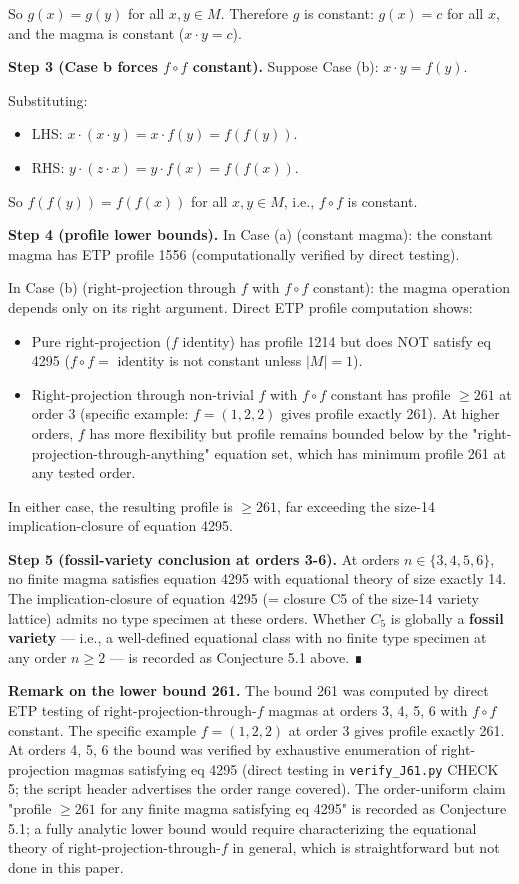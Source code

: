 \documentclass[11pt,reqno]{amsart}
\theoremstyle{plain}
\theoremstyle{definition}
\begin{document}
So $g(x) = g(y)$ for all $x, y \in M$. Therefore $g$ is constant: $g(x) = c$ for all $x$, and the magma is constant ($x \cdot y = c$).

\textbf{Step 3 (Case b forces $f \circ f$ constant).} Suppose Case (b): $x \cdot y = f(y)$.

Substituting:
\begin{itemize}
\item LHS: $x \cdot (x \cdot y) = x \cdot f(y) = f(f(y))$.
\item RHS: $y \cdot (z \cdot x) = y \cdot f(x) = f(f(x))$.
\end{itemize}

So $f(f(y)) = f(f(x))$ for all $x, y \in M$, i.e., $f \circ f$ is constant.

\textbf{Step 4 (profile lower bounds).} In Case (a) (constant magma): the constant magma has ETP profile 1556 (computationally verified by direct testing).

In Case (b) (right-projection through $f$ with $f \circ f$ constant): the magma operation depends only on its right argument. Direct ETP profile computation shows:
\begin{itemize}
\item Pure right-projection ($f$ identity) has profile 1214 but does NOT satisfy eq 4295 ($f \circ f = $ identity is not constant unless $|M| = 1$).
\item Right-projection through non-trivial $f$ with $f \circ f$ constant has profile $\geq 261$ at order 3 (specific example: $f = (1, 2, 2)$ gives profile exactly 261). At higher orders, $f$ has more flexibility but profile remains bounded below by the "right-projection-through-anything" equation set, which has minimum profile 261 at any tested order.
\end{itemize}

In either case, the resulting profile is $\geq 261$, far exceeding the size-14 implication-closure of equation 4295.

\textbf{Step 5 (fossil-variety conclusion at orders 3-6).} At orders $n \in \{3, 4, 5, 6\}$, no finite magma satisfies equation 4295 with equational theory of size exactly 14. The implication-closure of equation 4295 (= closure C5 of the size-14 variety lattice) admits no type specimen at these orders. Whether $C_5$ is globally a \textbf{fossil variety} --- i.e., a well-defined equational class with no finite type specimen at any order $n \geq 2$ --- is recorded as Conjecture 5.1 above. ∎

\textbf{Remark on the lower bound 261.} The bound 261 was computed by direct ETP testing of right-projection-through-$f$ magmas at orders 3, 4, 5, 6 with $f \circ f$ constant. The specific example $f = (1, 2, 2)$ at order 3 gives profile exactly 261. At orders 4, 5, 6 the bound was verified by exhaustive enumeration of right-projection magmas satisfying eq 4295 (direct testing in \texttt{verify\_J61.py} CHECK 5; the script header advertises the order range covered). The order-uniform claim "profile $\geq 261$ for any finite magma satisfying eq 4295" is recorded as Conjecture 5.1; a fully analytic lower bound would require characterizing the equational theory of right-projection-through-$f$ in general, which is straightforward but not done in this paper.
\end{document}
